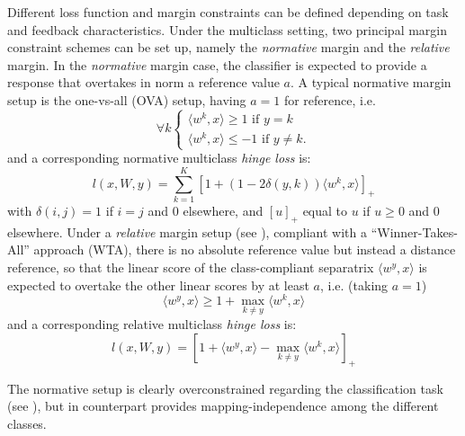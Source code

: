 \documentclass[preprint,12pt,authoryear]{elsarticle}
\begin{document}
Different loss function and margin constraints can be defined depending on task and feedback characteristics. 
Under the multiclass setting, two principal margin constraint schemes can be set up, namely the \emph{normative} margin and the \emph{relative} margin. In the \emph{normative} margin case, the classifier is expected to provide a response that overtakes in norm a reference value $a$. A typical normative margin setup is the one-vs-all (OVA) setup, having  $a = 1$ for reference,  i.e. $$\forall k \left\{
\begin{array}{l}
\langle w^k, x \rangle \geq 1 \text{ if } y = k \\
\langle w^k, x \rangle \leq -1 \text{ if }y \neq k.
\end{array}
\right. 
$$
and a corresponding normative multiclass \emph{hinge loss} is:  
$$ l(x,W,y) = \sum_{k=1}^K \left[1 + (1 - 2 \delta(y,k)) \langle w^k,x \rangle\right]_+
$$
with $\delta(i,j) =1$ if $i = j$ and 0 elsewhere, and $[u]_+$ equal to $u$ if $u\geq 0$ and 0 elsewhere.
Under  a \emph{relative} margin setup (see \cite{crammer2003ultraconservative}), compliant with a ``Winner-Takes-All'' approach (WTA), there is no absolute reference value but instead a distance reference, so that the linear score of the class-compliant separatrix $\langle w^y, x\rangle$ is expected to overtake  the other linear scores by at least $a$, i.e. (taking $a=1$)
$$ \langle w^y, x \rangle \geq 1 + \max_{k \neq y} \langle w^k, x \rangle  $$
and a corresponding relative multiclass \emph{hinge loss} is:
$$ l (x,W,y) =  \left[ 1 +  \langle w^y, x \rangle - \max_{k \neq y} \langle w^k, x\rangle\right]_+$$

The normative setup is clearly overconstrained regarding the classification task (see \cite{crammer2003ultraconservative}), but in counterpart provides mapping-independence among the different classes.

\end{document}
